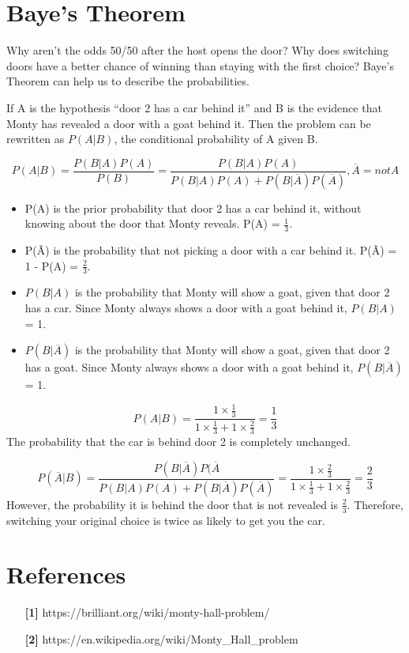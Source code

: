 \documentclass{article}
\begin{document}
\section{Baye's Theorem}
    \quad Why aren’t the odds 50/50 after the host opens the door? Why does switching doors have a better chance of winning than staying with the first choice? Baye's Theorem can help us to  describe the probabilities. \par
    If A is the hypothesis ``door 2 has a car behind it'' and B is the evidence that Monty has revealed a door with a goat behind it. Then the problem can be rewritten as \(P(A|B)\), the conditional probability of A given B.
    
    \begin{equation}
        P(A|B) = \frac{P(B|A)P(A)}{P(B)} = \frac{P(B|A)P(A)}{P(B|A)P(A)+P(B|\overline{A})P(\overline{A})}, \overline{A} = notA
    \end{equation}
    
    \begin{itemize}
        \item P(A) is the prior probability that door 2 has a car behind it, without knowing about the door that Monty reveals. P(A) = \(\frac{1}{3}\).
        \item P(Ã) is the probability that not picking a door with a car behind it. P(Ã) = 1 - P(A) = \(\frac{2}{3}\).
        \item \(P(B|A)\) is the probability that Monty will show a goat, given that door 2 has a car. Since Monty always shows a door with a goat behind it, \(P(B|A)\) = 1.
        \item \(P(B|\overline{A})\) is the probability that Monty will show a goat, given that door 2 has a goat. Since Monty always shows a door with a goat behind it, \(P(B|\overline{A})\) = 1.
    \end{itemize}
    \[P(A|B) = \frac{1 \times \frac{1}{3}}{1 \times \frac{1}{3} + 1 \times \frac{2}{3}} = \frac{1}{3}\]
    The probability that the car is behind door 2 is completely unchanged. 
    
    \[P(\overline{A}|B) = \frac{P(B|\overline{A})P(\overline{A}}{P(B|A)P(A)+P(B|\overline{A})P(\overline{A})} = \frac{1 \times \frac{2}{3}}{1 \times \frac{1}{3} + 1 \times \frac{2}{3}} = \frac{2}{3}\]
    However, the probability it is behind the door that is not revealed is \(\frac{2}{3}\). Therefore, switching your original choice is twice as likely to get you the car.
\section{References}
    \begin{itemize}
        \item[\textbf{[1]}] https://brilliant.org/wiki/monty-hall-problem/
        \item[\textbf{[2]}] https://en.wikipedia.org/wiki/Monty\_Hall\_problem
    \end{itemize}
\end{document}
